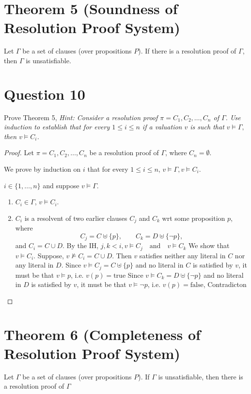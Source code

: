 \documentclass{article}
\begin{document}
\section*{Theorem 5 (Soundness of Resolution Proof System)}
Let $\Gamma$ be a set of clauses (over propositions $P$). If there is a resolution proof of $\Gamma$, then $\Gamma$ is unsatisfiable.

\section*{Question 10}
Prove Theorem 5, \textit{Hint: Consider a resolution proof $\pi = C_1, C_2, \dots, C_n$ of $\Gamma$. Use induction to establish that for every $1 \le i \le n$ if a valuation $v$ is such that $v \models \Gamma,$ then $v \models C_i$.}
\begin{proof}
    Let $\pi = C_1, C_2, \dots, C_n$ be a resolution proof of $\Gamma$, where $C_n = \emptyset$.
    
    We prove by induction on $i$ that for every $1 \leq i \leq n$, $v \models \Gamma, v \models C_i$.
    
    $i \in \{1,\dots,n\}$ and suppose $v \models \Gamma$.
    \begin{enumerate}
        \item $C_i \in \Gamma$, $v \models C_i$.
    
        \item $C_i$ is a resolvent of two earlier clauses $C_j$ and $C_k$ wrt some proposition $p$, where
        \[
        C_j = C \uplus \{p\}, \qquad C_k = D \uplus \{\neg p\},
        \]
        and
        $
        C_i = C \cup D.
        $
        By the IH, $j,k < i, v \models C_j \quad \text{and} \quad v \models C_k$
        We show that $v \models C_i$.
        Suppose, $v \not\models C_i = C \cup D$. Then $v$ satisfies neither any literal in $C$ nor any literal in $D$.
        Since $v \models C_j = C \uplus \{p\}$ and no literal in $C$ is satisfied by $v$, it must be that $v \models p$, i.e. $v(p)=\mathrm{true}$
        Since $v \models C_k = D \uplus \{\neg p\}$ and no literal in $D$ is satisfied by $v$, it must be that $v \models \neg p$, i.e. $v(p)=\mathrm{false}$,
    Contradicton
    \end{enumerate}
    \end{proof}
\section*{Theorem 6 (Completeness of Resolution Proof System)}
Let $\Gamma$ be a set of clauses (over propositions $P$). If $\Gamma$ is unsatisfiable, then there is a resolution proof of $\Gamma$
\end{document}
